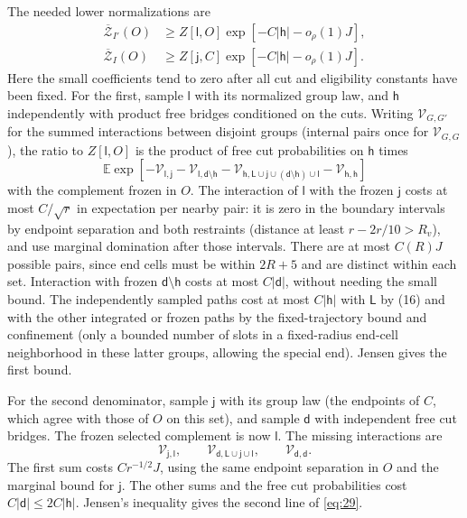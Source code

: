 The needed lower normalizations are
\[
 \begin{split}
     \overline{\mathcal Z}_{I'}(O)&\ge
              Z[\mathsf l,O]\exp[-C|\mathsf h|-o_\rho(1)J],\\
     \overline{\mathcal Z}_{I}(O)&\ge
              Z[\mathsf j,C]\exp[-C|\mathsf h|-o_\rho(1)J].
 \end{split}                                                          \tag{29}\label{eq:29}
\]
Here the small coefficients tend to zero after all cut and eligibility
constants have been fixed. For the first, sample \(\mathsf l\) with its normalized group law, and \(\mathsf h\) independently with product free bridges conditioned on the cuts. Writing \(\mathcal V_{G,G'}\) for the summed interactions between disjoint groups (internal pairs once for \(\mathcal V_{G,G}\)), the ratio to \(Z[\mathsf l,O]\) is the product of free cut probabilities on \(\mathsf h\) times
\[
 \mathbb E\exp[-\mathcal V_{\mathsf l,\mathsf j}
               -\mathcal V_{\mathsf l,\mathsf d\setminus\mathsf h}
               -\mathcal V_{\mathsf h,\mathsf L\cup\mathsf j\cup(\mathsf d\setminus\mathsf h)\cup\mathsf l}
               -\mathcal V_{\mathsf h,\mathsf h}]
\]
with the complement frozen in \(O\). The interaction of \(\mathsf l\) with the frozen \(\mathsf j\) costs at most \(C/\sqrt r\) in expectation per nearby pair: it is zero in the boundary intervals by endpoint separation and both restraints (distance at least \(r-2r/10>R_v\)), and use marginal domination after those intervals. There are at most \(C(R)J\) possible pairs, since end cells must be within \(2R+5\) and are distinct within each set. Interaction with frozen \(\mathsf d\setminus\mathsf h\) costs at most \(C|\mathsf d|\), without needing the small bound. The independently sampled paths cost at most \(C|\mathsf h|\) with \(\mathsf L\) by (16) and with the other integrated or frozen paths by the fixed-trajectory bound and confinement (only a bounded number of slots in a fixed-radius end-cell neighborhood in these latter groups, allowing the special end). Jensen gives the first bound. 

For the second denominator, sample $\mathsf j$ with its group law
(the endpoints of $C$, which agree with those of $O$ on this set),
and sample $\mathsf d$ with independent free cut bridges. The frozen
selected complement is now $\mathsf l$. The missing interactions are
\[
 \mathcal V_{\mathsf j,\mathsf l},\qquad
 \mathcal V_{\mathsf d,\mathsf L\cup\mathsf j\cup\mathsf l},\qquad
 \mathcal V_{\mathsf d,\mathsf d}.
\]
The first sum costs $C r^{-1/2}J$, using the same endpoint separation
in $O$ and the marginal bound for $\mathsf j$. The other sums and the
free cut probabilities cost $C|\mathsf d|\le2C|\mathsf h|$. Jensen's
inequality gives the second line of \eqref{eq:29}.

